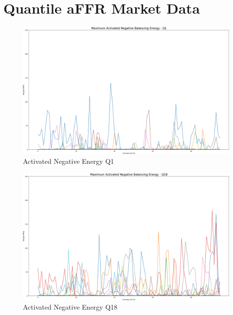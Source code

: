 \section{Quantile aFFR Market Data}
\label{chap:app_QaFFRmarketData}
\begin{figure}[H]
	\centering
	\includegraphics[width=1\linewidth]{pictures/results/Activated_negEnergy_Q1.png}
	\caption{Activated Negative Energy Q1}
	\label{fig:_negEnergy_Q1}
\end{figure}

\begin{figure}[H]
	\centering
	\includegraphics[width=1\linewidth]{pictures/results/Activated_negEnergy_Q18.png}
	\caption{Activated Negative Energy Q18}
	\label{fig:_negEnergy_Q18}
\end{figure}

